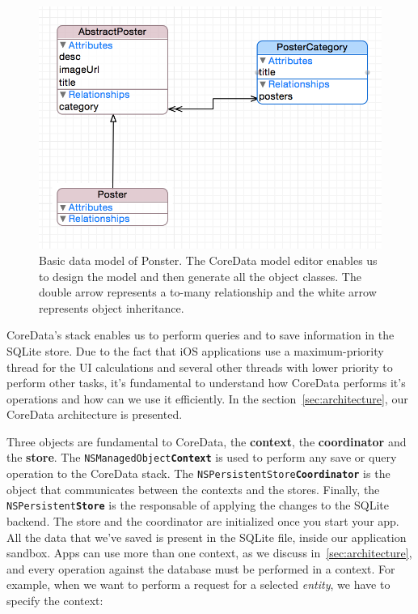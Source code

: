 \begin{figure}
\centering
\includegraphics[scale=0.85]{img/coredata.png}
\caption{\label{fig:coredata}Basic data model of Ponster. The CoreData model editor
  enables us to design the model and then generate all the object classes. The
  double arrow represents a to-many relationship and the white arrow represents
  object inheritance.}
\end{figure} 

CoreData's stack enables us to perform queries and to save information in the SQLite
store. Due to the fact that iOS applications use a maximum-priority thread for the
UI calculations and several other threads with lower priority to perform other
tasks, it's fundamental to understand how CoreData performs it's operations and how
can we use it efficiently. In the section~\ref{sec:architecture}, our CoreData
architecture is presented.

Three objects are fundamental to CoreData, the \textbf{context}, the \textbf{coordinator}
and the \textbf{store}. The \texttt{NSManagedObject\textbf{Context}} is used to perform
any save or query operation to the CoreData stack. The
\texttt{NSPersistentStore\textbf{Coordinator}} is the object that communicates
between the contexts and the stores. Finally, the
\texttt{NSPersistent\textbf{Store}} is the responsable of applying the changes to
the SQLite backend. The store and the coordinator are initialized once you start
your app. All the data that we've saved is present in the SQLite file, inside our
application sandbox. Apps can use more than one context, as we discuss
in~\ref{sec:architecture}, and every operation against the database must be
performed in a context. For example, when we want to perform a request for a
selected \textit{entity}, we have to specify the context:

